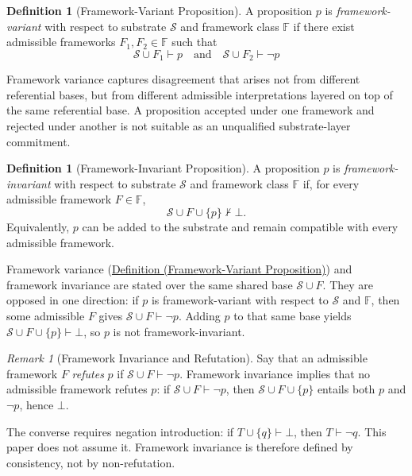 \documentclass[11pt]{article}
\theoremstyle{plain}
\theoremstyle{definition}
\newtheorem{definition}[theorem]{Definition}
\theoremstyle{remark}
\newtheorem{remark}[theorem]{Remark}
\newcommand{\DefRef}[2]{\hyperref[#1]{Definition (#2)}}
\newcommand{\Substrate}{\mathcal{S}}
\newcommand{\Frameworks}{\mathbb{F}}
\newcommand{\Framework}{F}
\newcommand{\FrameworkOne}{F_1}
\newcommand{\FrameworkTwo}{F_2}
\newcommand{\entails}{\vdash}
\newcommand{\notentails}{\nvdash}
\begin{document}
\begin{definition}[Framework-Variant Proposition]
  \label{se100.def.FrameworkVariant}
  A proposition $p$ is \emph{framework-variant}
  with respect to substrate $\Substrate$ and framework class $\Frameworks$
  if there exist admissible frameworks $\FrameworkOne, \FrameworkTwo \in \Frameworks$
  such that
  \[
    \Substrate \cup \FrameworkOne \entails p
    \quad\text{and}\quad
    \Substrate \cup \FrameworkTwo \entails \neg p
  \]
\end{definition}

Framework variance captures disagreement that arises
not from different referential bases,
but from different admissible interpretations
layered on top of the same referential base.
A proposition accepted under one framework
and rejected under another is
not suitable as an unqualified substrate-layer commitment.

\begin{definition}[Framework-Invariant Proposition]
  \label{se100.def.FrameworkInvariant}
  A proposition $p$ is \emph{framework-invariant} with respect to substrate
  $\Substrate$ and framework class $\Frameworks$
  if, for every admissible framework $\Framework \in \Frameworks$,
  \[
    \Substrate \cup \Framework \cup \{p\} \notentails \bot .
  \]
  Equivalently,
  $p$ can be added to the substrate and
  remain compatible with every admissible framework.
\end{definition}

Framework variance
(\DefRef{se100.def.FrameworkVariant}{Framework-Variant Proposition})
and framework invariance are stated over the same shared base
$\Substrate \cup \Framework$.
They are opposed in one direction:
if $p$ is framework-variant with respect to $\Substrate$ and $\Frameworks$,
then some admissible $\Framework$ gives
$\Substrate \cup \Framework \entails \neg p$.
Adding $p$ to that same base yields
$\Substrate \cup \Framework \cup \{p\} \entails \bot$,
so $p$ is not framework-invariant.

\begin{remark}[Framework Invariance and Refutation]
  \label{se100.remark.FrameworkInvariantRefutation}
  Say that an admissible framework $\Framework$ \emph{refutes} $p$
  if $\Substrate \cup \Framework \entails \neg p$.
  Framework invariance implies that no admissible framework refutes $p$:
  if $\Substrate \cup \Framework \entails \neg p$,
  then $\Substrate \cup \Framework \cup \{p\}$ entails both $p$ and $\neg p$,
  hence $\bot$.

  The converse requires negation introduction:
  if $T \cup \{q\} \entails \bot$, then $T \entails \neg q$.
  This paper does not assume it.
  Framework invariance is therefore defined by consistency,
  not by non-refutation.
\end{remark}
\end{document}
